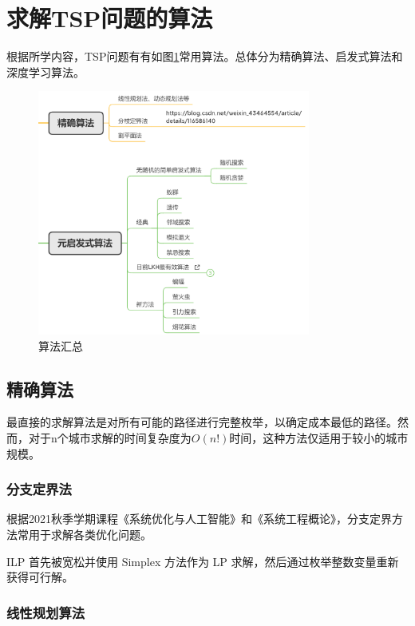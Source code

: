 \documentclass[lang=cn,11pt]{elegantpaper}
\begin{document}
\section{求解TSP问题的算法}
根据所学内容，TSP问题有有如图\ref{img:算法汇总}常用算法。总体分为精确算法、启发式算法和深度学习算法。

\begin{figure}[h]
  \centering
  \includegraphics[width=0.8\textwidth]{figure/算法汇总.png} %
  \caption{算法汇总 } %
   \label{img:算法汇总}
\end{figure}

\subsection{精确算法}
最直接的求解算法是对所有可能的路径进行完整枚举，以确定成本最低的路径。然而，对于n个城市求解的时间复杂度为$O(n!)$时间，这种方法仅适用于较小的城市规模。

\subsubsection{分支定界法}
根据2021秋季学期课程《系统优化与人工智能》和《系统工程概论》，分支定界方法常用于求解各类优化问题。

 ILP 首先被宽松并使用 Simplex 方法作为 LP 求解，然后通过枚举整数变量重新获得可行解。



\subsubsection{线性规划算法}
\end{document}

